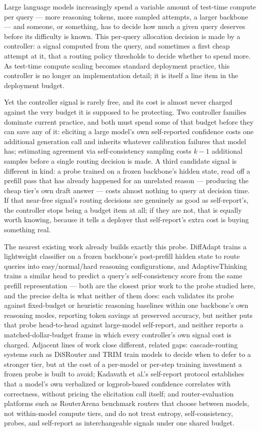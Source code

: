 \documentclass[11pt]{article}
\begin{document}
Large language models increasingly spend a variable amount of test-time compute per query --- more reasoning tokens, more sampled attempts, a larger backbone --- and someone, or something, has to decide how much a given query deserves before its difficulty is known. This per-query allocation decision is made by a controller: a signal computed from the query, and sometimes a first cheap attempt at it, that a routing policy thresholds to decide whether to spend more. As test-time compute scaling becomes standard deployment practice, this controller is no longer an implementation detail; it is itself a line item in the deployment budget.

Yet the controller signal is rarely free, and its cost is almost never charged against the very budget it is supposed to be protecting. Two controller families dominate current practice, and both must spend some of that budget before they can save any of it: eliciting a large model's own self-reported confidence costs one additional generation call and inherits whatever calibration failures that model has; estimating agreement via self-consistency sampling costs $k-1$ additional samples before a single routing decision is made. A third candidate signal is different in kind: a probe trained on a frozen backbone's hidden state, read off a prefill pass that has already happened for an unrelated reason --- producing the cheap tier's own draft answer --- costs almost nothing to query at decision time. If that near-free signal's routing decisions are genuinely as good as self-report's, the controller stops being a budget item at all; if they are not, that is equally worth knowing, because it tells a deployer that self-report's extra cost is buying something real.

The nearest existing work already builds exactly this probe. DiffAdapt trains a lightweight classifier on a frozen backbone's post-prefill hidden state to route queries into easy/normal/hard reasoning configurations, and AdaptiveThinking trains a similar head to predict a query's self-consistency score from the same prefill representation --- both are the closest prior work to the probe studied here, and the precise delta is what neither of them does: each validates its probe against fixed-budget or heuristic reasoning baselines within one backbone's own reasoning modes, reporting token savings at preserved accuracy, but neither puts that probe head-to-head against large-model self-report, and neither reports a matched-dollar-budget frame in which every controller's own signal cost is charged. Adjacent lines of work close different, related gaps: cascade-routing systems such as DiSRouter and TRIM train models to decide when to defer to a stronger tier, but at the cost of a per-model or per-step training investment a frozen probe is built to avoid; Kadavath et al.'s self-report protocol establishes that a model's own verbalized or logprob-based confidence correlates with correctness, without pricing the elicitation call itself; and router-evaluation platforms such as RouterArena benchmark routers that choose between models, not within-model compute tiers, and do not treat entropy, self-consistency, probes, and self-report as interchangeable signals under one shared budget.
\end{document}

